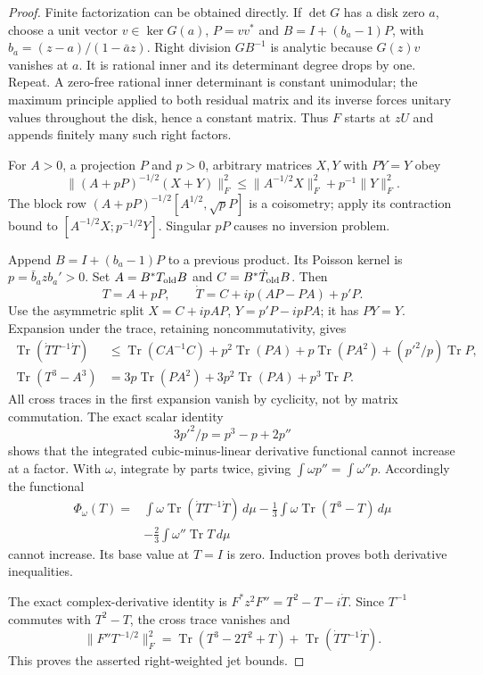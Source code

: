 \begin{proof}
Finite factorization can be obtained directly. If $\det G$ has a disk
zero $a$, choose a unit vector $v\in\ker G(a)$, $P=vv^*$ and
$B=I+(b_a-1)P$, with $b_a=(z-a)/(1-\bar az)$.
Right division $GB^{-1}$ is analytic because $G(z)v$ vanishes at $a$.
It is rational inner and its determinant degree drops by one.
Repeat. A zero-free rational inner determinant is constant unimodular;
the maximum principle applied to both residual matrix and its inverse
forces unitary values throughout the disk, hence a constant matrix.
Thus $F$ starts at $zU$ and appends finitely many such right factors.

For $A>0$, a projection $P$ and $p>0$, arbitrary matrices $X,Y$ with
$PY=Y$ obey
\[
 \|(A+pP)^{-1/2}(X+Y)\|_F^2
 \le\|A^{-1/2}X\|_F^2+p^{-1}\|Y\|_F^2.
\]
The block row $(A+pP)^{-1/2}[A^{1/2},\sqrt p P]$ is a coisometry;
apply its contraction bound to
$[A^{-1/2}X;p^{-1/2}Y]$. Singular $pP$ causes no inversion problem.

Append $B=I+(b_a-1)P$ to a previous product. Its Poisson kernel is
$p=\bar b_a z b_a'>0$. Set
$A=B^*T_{\rm old}B$ and $C=B^*\dot T_{\rm old}B$.
Then
\[
 T=A+pP,\qquad \dot T=C+ip(AP-PA)+p'P.
\]
Use the asymmetric split
$X=C+ipAP$, $Y=p'P-ipPA$; it has $PY=Y$.
Expansion under the trace, retaining noncommutativity, gives
\begin{align*}
 \operatorname{Tr}(\dot T T^{-1}\dot T)
 &\le\operatorname{Tr}(CA^{-1}C)
 +p^2\operatorname{Tr}(PA)+p\operatorname{Tr}(PA^2)
 +(p'^2/p)\operatorname{Tr}P,\\
 \operatorname{Tr}(T^3-A^3)
 &=3p\operatorname{Tr}(PA^2)+3p^2\operatorname{Tr}(PA)
 +p^3\operatorname{Tr}P.
\end{align*}
All cross traces in the first expansion vanish by cyclicity, not by
matrix commutation. The exact scalar identity
\[
 3p'^2/p=p^3-p+2p''
\]
shows that the integrated cubic-minus-linear derivative functional cannot
increase at a factor. With $\omega$, integrate by parts twice, giving
$\int\omega p''=\int\omega''p$. Accordingly the functional
\begin{align*}
 \Phi_\omega(T)={}&\int\omega\operatorname{Tr}(\dot T T^{-1}\dot T)\,d\mu
 -\frac13\int\omega\operatorname{Tr}(T^3-T)\,d\mu\\
 &-\frac23\int\omega''\operatorname{Tr}T\,d\mu
\end{align*}
cannot increase. Its base value at $T=I$ is zero. Induction proves both
derivative inequalities.

The exact complex-derivative identity is
$F^*z^2F''=T^2-T-i\dot T$. Since $T^{-1}$ commutes with $T^2-T$,
the cross trace vanishes and
\[
 \|F''T^{-1/2}\|_F^2
 =\operatorname{Tr}(T^3-2T^2+T)
 +\operatorname{Tr}(\dot T T^{-1}\dot T).
\]
This proves the asserted right-weighted jet bounds.


\end{proof}
